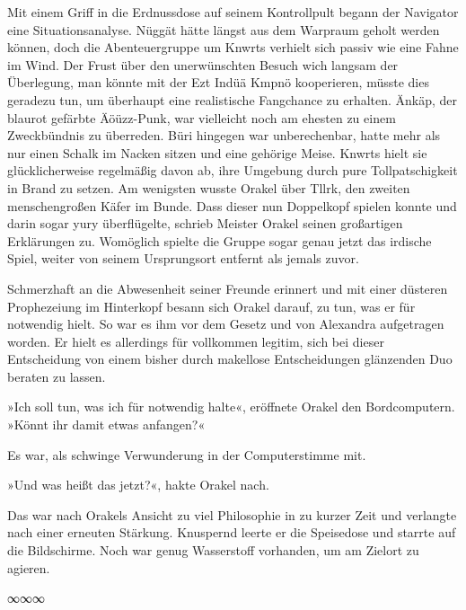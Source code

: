 Mit einem Griff in die Erdnussdose auf seinem Kontrollpult begann der Navigator eine Situationsanalyse. Nüggät hätte längst aus dem Warpraum geholt werden können, doch die Abenteuergruppe um Knwrts verhielt sich passiv wie eine Fahne im Wind. Der Frust über den unerwünschten Besuch wich langsam der Überlegung, man könnte mit der Ezt Indüä Kmpnö kooperieren, müsste dies geradezu tun, um überhaupt eine realistische Fangchance zu erhalten. Änkäp, der blaurot gefärbte Äöüzz-Punk, war vielleicht noch am ehesten zu einem Zweckbündnis zu überreden. Büri hingegen war unberechenbar, hatte mehr als nur einen Schalk im Nacken sitzen und eine gehörige Meise. Knwrts hielt sie glücklicherweise regelmäßig davon ab, ihre Umgebung durch pure Tollpatschigkeit in Brand zu setzen. Am wenigsten wusste Orakel über Tllrk, den zweiten menschengroßen Käfer im Bunde. Dass dieser nun Doppelkopf spielen konnte und darin sogar yury überflügelte, schrieb Meister Orakel seinen großartigen Erklärungen zu. Womöglich spielte die Gruppe sogar genau jetzt das irdische Spiel, weiter von seinem Ursprungsort entfernt als jemals zuvor.

Schmerzhaft an die Abwesenheit seiner Freunde erinnert und mit einer düsteren Prophezeiung im Hinterkopf besann sich Orakel darauf, zu tun, was er für notwendig hielt. So war es ihm vor dem Gesetz und von Alexandra aufgetragen worden. Er hielt es allerdings für vollkommen legitim, sich bei dieser Entscheidung von einem bisher durch makellose Entscheidungen glänzenden Duo beraten zu lassen.

»Ich soll tun, was ich für notwendig halte«, eröffnete Orakel den Bordcomputern. »Könnt ihr damit etwas anfangen?«

Es war, als schwinge Verwunderung in der Computerstimme mit. 

»Und was heißt das jetzt?«, hakte Orakel nach.


Das war nach Orakels Ansicht zu viel Philosophie in zu kurzer Zeit und verlangte nach einer erneuten Stärkung. Knuspernd leerte er die Speisedose und starrte auf die Bildschirme. Noch war genug Wasserstoff vorhanden, um am Zielort zu agieren.

\begin{center}
∞∞∞
\end{center}

